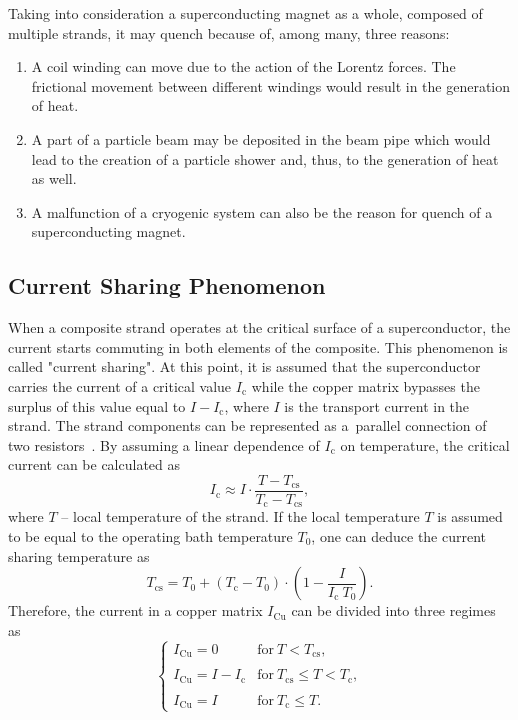 Taking into consideration a superconducting magnet as a whole, composed of multiple strands, it may quench because of, among many, three reasons: 
\begin{enumerate}
    \item A coil winding can move due to the action of the Lorentz forces. The frictional movement between different windings would result in the generation of heat.
    \item A part of a particle beam may be deposited in the beam pipe which would lead to the creation of a particle shower and, thus, to the generation of heat as well. 
    \item A malfunction of a cryogenic system can also be the reason for quench of a superconducting magnet. 
\end{enumerate}

\subsection{Current Sharing Phenomenon}

When a composite strand operates at the critical surface of a superconductor, the current starts commuting in both elements of the composite. This phenomenon is called "current sharing". At this point, it is assumed that the superconductor carries the current of a critical value $I_\text{c}$ while the copper matrix bypasses the surplus of this value equal to $I-I_\text{c}$, where $I$ is the transport current in the strand. The strand components can be represented as a~parallel connection of two resistors~\cite[p.~119-121]{superconducting_accelerator_magnets}. By assuming a linear dependence of $I_\text{c}$ on temperature, the critical current can be calculated as
\begin{equation}
    I_\text{c} \approx I \cdot \frac{T-T_\text{cs}}{T_\text{c}-T_\text{cs}},
\end{equation}
where $T$ -- local temperature of the strand. If the local temperature $T$ is assumed to be equal to the operating bath temperature $T_0$, one can deduce the current sharing temperature as
\begin{equation}
    T_\text{cs} = T_\text{0} + (T_\text{c} - T_\text{0}) \cdot (1 - \frac{I}{I_\text{c}~T_0}).
\end{equation}
Therefore, the current in a copper matrix $I_\text{Cu}$ can be divided into three regimes as
\begin{equation}
    \left\{ \begin{array}{ lll }
    I_\text{Cu} = 0 & \text{for}~T < T_\text{cs}, \\ \\
    I_\text{Cu} = I - I_\text{c} & \text{for}~T_\text{cs} \leq T<T_\text{c},  \\ \\
    I_\text{Cu} = I & \text{for}~T_\text{c} \leq T.
    \end{array} \right.
    \label{eqn:current_sharing}
\end{equation}


